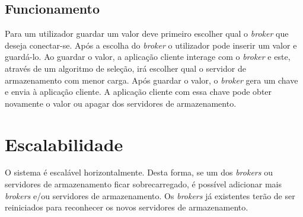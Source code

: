 \subsection{Funcionamento}
Para um utilizador guardar um valor deve primeiro escolher qual o \textit{broker} que deseja conectar-se. Após a escolha do \textit{broker} o utilizador pode inserir um valor e guardá-lo. Ao guardar o valor, a aplicação cliente interage com o \textit{broker} e este, através de um algoritmo de seleção, irá escolher qual o servidor de armazenamento com menor carga. Após guardar o valor, o \textit{broker} gera um chave e envia à aplicação cliente. A aplicação cliente com essa chave pode obter novamente o valor ou apagar dos servidores de armazenamento.

\section{Escalabilidade}
O sistema é escalável horizontalmente. Desta forma, se um dos \textit{brokers} ou servidores de armazenamento ficar sobrecarregado, é possível adicionar mais \textit{brokers} e/ou servidores de armazenamento. Os \textit{brokers} já existentes terão de ser reiniciados para reconhecer os novos servidores de armazenamento.